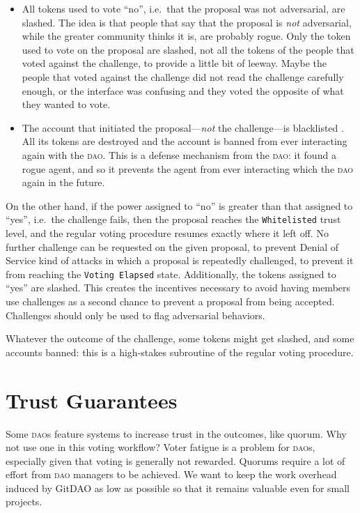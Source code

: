 \begin{itemize}
  \item 
    All tokens used to vote \enquote{no}, i.e.\ that the proposal was not adversarial, are slashed.
    The idea is that people that say that the proposal is \emph{not} adversarial, while the greater community thinks it is, are probably rogue.
    Only the token used to vote on the proposal are slashed, not all the tokens of the people that voted against the challenge, to provide a little bit of leeway.
    Maybe the people that voted against the challenge did not read the challenge carefully enough, or the interface was confusing and they voted the opposite of what they wanted to vote.

  \item 
    The account that initiated the proposal---\textit{not} the challenge---is blacklisted%
    .
    All its tokens are destroyed and the account is banned from ever interacting again with the \textsc{dao}.
    This is a defense mechanism from the \textsc{dao}: it found a rogue agent, and so it prevents the agent from ever interacting which the \textsc{dao} again in the future.
\end{itemize}

On the other hand, if the power assigned to \enquote{no} is greater than that assigned to \enquote{yes}, i.e.\ the challenge fails, then the proposal reaches the \texttt{Whitelisted} trust level, and the regular voting procedure resumes exactly where it left off.
No further challenge can be requested on the given proposal, to prevent Denial of Service kind of attacks in which a proposal is repeatedly challenged, to prevent it from reaching the \texttt{Voting Elapsed} state.
Additionally, the tokens assigned to \enquote{yes} are slashed.
This creates the incentives necessary to avoid having members use challenges as a second chance to prevent a proposal from being accepted.
Challenges should only be used to flag adversarial behaviors.

Whatever the outcome of the challenge, some tokens might get slashed, and some accounts banned: this is a high-stakes subroutine of the regular voting procedure.

\section{Trust Guarantees}

Some \textsc{dao}s feature systems to increase trust in the outcomes, like quorum.
Why not use one in this voting workflow?
Voter fatigue is a problem for \textsc{dao}s, especially given that voting is generally not rewarded.
Quorums require a lot of effort from \textsc{dao} managers to be achieved.
We want to keep the work overhead induced by GitDAO as low as possible so that it remains valuable even for small projects.
